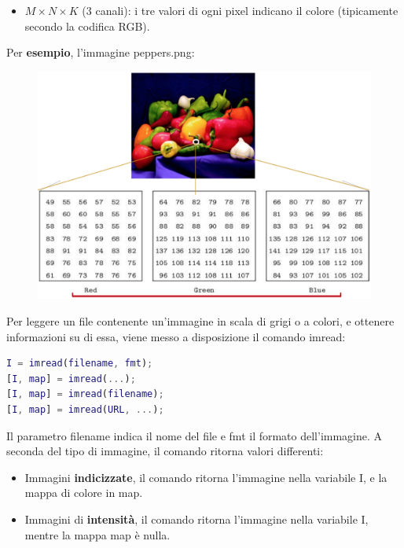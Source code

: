 \documentclass[a4paper]{article}
\begin{document}
\begin{itemize}
\begin{itemize}
			\item $M \times N \times K$ (3 canali): i tre valori di ogni pixel indicano il colore (tipicamente secondo la codifica RGB).
		\end{itemize}
		Per \textcolor{Green4}{\textbf{esempio}}, l'immagine \textsf{peppers.png}:
		\begin{figure}[!htp]
			\centering
			\includegraphics[width=\textwidth]{img/lab/visualizzazione-segnali_5.jpg}
		\end{figure}
	\end{itemize}
	Per leggere un file contenente un'immagine in scala di grigi o a colori, e ottenere informazioni su di essa, viene messo a disposizione il comando \textsf{imread}:
	\begin{lstlisting}[language=MATLAB]
I = imread(filename, fmt);
[I, map] = imread(...);
[I, map] = imread(filename);
[I, map] = imread(URL, ...);\end{lstlisting}
	Il parametro \textsf{filename} indica il nome del file e \textsf{fmt} il formato dell'immagine. A seconda del tipo di immagine, il comando ritorna valori differenti:
	\begin{itemize}
		\item Immagini \textbf{indicizzate}, il comando ritorna l'immagine nella variabile \textsf{I}, e la mappa di colore in \textsf{map}.
		
		\item Immagini di \textbf{intensità}, il comando ritorna l'immagine nella variabile \textsf{I}, mentre la mappa \textsf{map} è nulla.
	\end{itemize}\newpage
\end{document}
